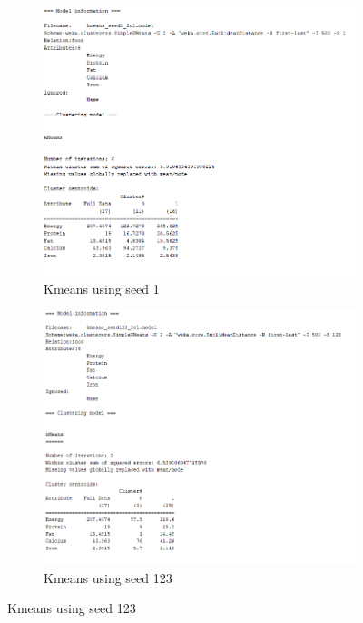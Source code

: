 \documentclass[letterpaper,12pt]{article}
\begin{document}
\begin{figure}[H]
\begin{subfigure}{.4\textwidth}
  \centering
  \includegraphics[width=.8\linewidth]{kmeans_seed1_2cl_output}  
  \caption{Kmeans using seed 1}
  \label{fig:sub-first_2}
\end{subfigure}
\begin{subfigure}{.4\textwidth}
  \centering
  \includegraphics[width=.8\linewidth]{kmeans_seed123_2cl_output}  
  \caption{Kmeans using seed 123}
  \label{fig:sub-second_2}
\end{subfigure}



\end{figure}
\end{document}
